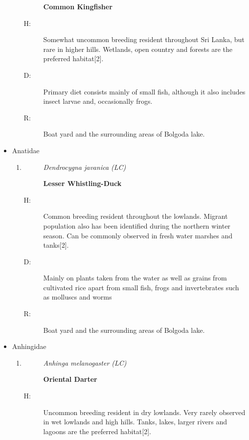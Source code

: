 \begin{itemize}
\begin{enumerate}
\begin{description}
\textbf{Common Kingfisher}%
\end{description}%
\begin{description}%
\item[H: ]%
Somewhat uncommon breeding resident throughout Sri Lanka, but rare in higher hills. Wetlands, open country and forests are the preferred habitat{[}2{]}.%
\item[D: ]%
Primary diet consists mainly of small fish, although it also includes insect larvae and, occasionally frogs.%
\item[R: ]%
Boat yard and the surrounding areas of Bolgoda lake.%
\end{description}%
\end{enumerate}%
\item%
Anatidae%
\begin{enumerate}%
\item%
\begin{description}%
\item[]%
\textit{Dendrocygna javanica (LC)}%
\item[]%
\textbf{Lesser Whistling{-}Duck}%
\end{description}%
\begin{description}%
\item[H: ]%
Common breeding resident throughout the lowlands. Migrant population also has been identified during the northern winter season. Can be commonly observed in fresh water marshes and tanks{[}2{]}.%
\item[D: ]%
Mainly on plants taken from the water as well as grains from cultivated rice apart from small fish, frogs and invertebrates such as molluscs and worms%
\item[R: ]%
Boat yard and the surrounding areas of Bolgoda lake.%
\end{description}%
\end{enumerate}%
\item%
Anhingidae%
\begin{enumerate}%
\item%
\begin{description}%
\item[]%
\textit{Anhinga melanogaster (LC)}%
\item[]%
\textbf{Oriental Darter}%
\end{description}%
\begin{description}%
\item[H: ]%
Uncommon breeding resident in dry lowlands. Very rarely observed in wet lowlands and high hills. Tanks, lakes, larger rivers and lagoons are the preferred habitat{[}2{]}.%

\end{description}
\end{enumerate}
\end{itemize}
